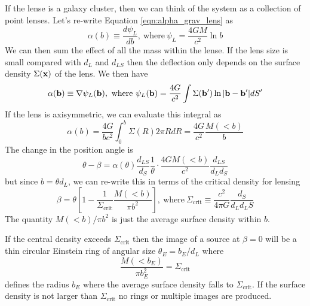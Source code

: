\documentclass[]{article}
\begin{document}
If the lense is a galaxy cluster, then we can
think of the system as a collection of point lenses.
Let's re-write Equation \ref{eqn:alpha_grav_lens} as
\begin{equation}
\alpha(b) \equiv \frac{d \psi_L}{db},~\mathrm{where}~\psi_L = \frac{4 GM}{c^2}\ln b
\end{equation}
\noindent
We can then sum the effect of all the mass within the lense.
If the lens size is small compared with $d_L$ and $d_{LS}$ then
the deflection only depends on the surface density $\Sigma(\mathbf{x})$
of the lens.  We then have
\begin{equation}
\alpha(\mathbf{b}) \equiv \nabla \psi_L(\mathbf{b}),~\mathrm{where}~\psi_L(\mathbf{b}) = \frac{4G}{c^2}\int \Sigma(\mathbf{b}') \ln |\mathbf{b} - \mathbf{b}'| dS'
\end{equation}
\noindent
If the lens is axisymmetric, we can evaluate this integral as
\begin{equation}
\alpha(b) = \frac{4G}{bc^2}\int_{0}^{b} \Sigma(R) 2 \pi R dR = \frac{4G}{c^2} \frac{M(<b)}{b}
\end{equation}
\noindent
The change in the position angle is
\begin{equation}
\theta - \beta = \alpha(\theta)\frac{d_{LS}}{d_S} \frac{1}{\theta} \cdot \frac{4GM(<b)}{c^2}\frac{d_{LS}}{d_L d_S}
\end{equation}
\noindent
but since $b = \theta d_L$, we can re-write this in terms of the critical density for lensing
\begin{equation}
\beta = \theta\left[1 - \frac{1}{\Sigma_{\mathrm{crit}}}\frac{M(<b)}{\pi b^2}\right],~\mathrm{where}~\Sigma_{\mathrm{crit}} \equiv \frac{c^2}{4\pi G}\frac{d_S}{d_L d_LS}
\end{equation}
\noindent
The quantity $M(<b)/\pi b^2$ is just the average surface density within $b$.

If the central density exceeds $\Sigma_{\mathrm{crit}}$ then the image of a
source at $\beta=0$ will be a thin circular Einstein ring of angular size $\theta_{E} = b_E/d_L$
where
\begin{equation}
\frac{M(<b_E)}{\pi b_E^2} = \Sigma_{\mathrm{crit}}
\end{equation}
defines the radius $b_E$ where the average surface density falls to $\Sigma_{\mathrm{crit}}$. If
the surface density is not larger than $\Sigma_\mathrm{crit}$ no rings or multiple images are produced.
\end{document}
